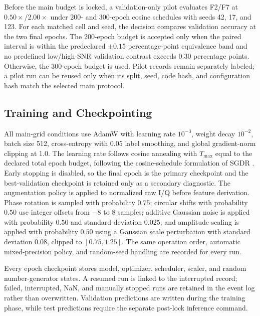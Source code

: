 Before the main budget is locked, a validation-only pilot evaluates F2/F7 at
$0.50\times$/$2.00\times$ under 200- and 300-epoch cosine schedules with seeds 42, 17, and
123. For each matched cell and seed, the decision compares validation
accuracy at the two final epochs. The 200-epoch budget is accepted only when
the paired interval is within the predeclared $\pm0.15$ percentage-point
equivalence band and no predefined low/high-SNR validation contrast exceeds
0.30 percentage points. Otherwise, the 300-epoch budget is used. Pilot records
remain separately labeled; a pilot run can be reused only when its split,
seed, code hash, and configuration hash match the selected main protocol.

\subsection{Training and Checkpointing}
All main-grid conditions use AdamW \cite{Loshchilov2019AdamW} with learning
rate $10^{-3}$, weight decay $10^{-2}$, batch size 512, cross-entropy with
0.05 label smoothing, and global gradient-norm clipping at 1.0. The learning
rate follows cosine annealing with $T_{\max}$ equal to the declared total
epoch budget, following the cosine-schedule formulation of SGDR
\cite{Loshchilov2017SGDR}. Early stopping is disabled, so the final epoch is
the primary checkpoint and the best-validation checkpoint is retained only as
a secondary diagnostic. The augmentation policy is applied to normalized raw I/Q before feature derivation.
Phase rotation is sampled with probability $0.75$; circular shifts with
probability $0.50$ use integer offsets from $-8$ to $8$ samples; additive
Gaussian noise is applied with probability $0.50$ and standard deviation
$0.025$; and amplitude scaling is applied with probability $0.50$ using a
Gaussian scale perturbation with standard deviation $0.08$, clipped to
$[0.75,1.25]$. The same operation order, automatic mixed-precision policy, and
random-seed handling are recorded for every run.

Every epoch checkpoint stores model, optimizer, scheduler, scaler, and random
number-generator states. A resumed run is linked to the interrupted record;
failed, interrupted, NaN, and manually stopped runs are retained in the event
log rather than overwritten. Validation predictions are written during the
training phase, while test predictions require the separate post-lock
inference command.

